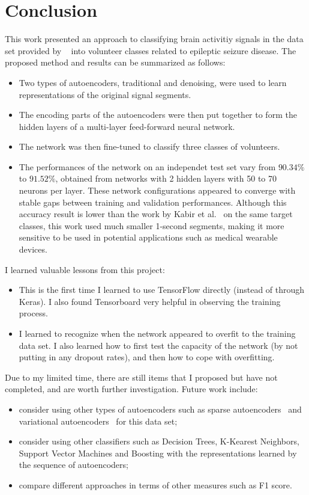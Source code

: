 \documentclass[12pt]{article}
\begin{document}
\section{Conclusion}

\noindent
This work presented an approach to classifying brain activitiy signals in the data set provided by ~\cite{andrzejak2001indications} into volunteer classes related to epileptic seizure disease. The proposed method and results can be summarized as follows:
\begin{itemize}
\item Two types of autoencoders, traditional and denoising, were used to learn representations of the original signal segments.
\item The encoding parts of the autoencoders were then put together to form the hidden layers of a multi-layer feed-forward neural network.
\item The network was then fine-tuned to classify three classes of volunteers.
\item The performances of the network on an independet test set vary from $90.34\%$ to $91.52\%$, obtained from networks with 2 hidden layers with 50 to 70 neurons per layer. These network configurations appeared to converge with stable gaps between training and validation performances. Although this accuracy result is lower than the work by Kabir et al.~\cite{kabir2016epileptic} on the same target classes, this work used much smaller 1-second segments, making it more sensitive to be used in potential applications such as medical wearable devices.
\end{itemize}

I learned valuable lessons from this project:
\begin{itemize}
\item This is the first time I learned to use TensorFlow directly (instead of through Keras). I also found Tensorboard very helpful in observing the training process.
\item I learned to recognize when the network appeared to overfit to the training data set. I also learned how to first test the capacity of the network (by not putting in any dropout rates), and then how to cope with overfitting.
\end{itemize}

Due to my limited time, there are still items that I proposed but have not completed, and are worth further investigation. Future work include: 
\begin{itemize}
\item consider using other types of autoencoders such as sparse autoencoders~\cite{boureau2008sparse} and variational autoencoders~\cite{kingma2013auto} for this data set;
\item consider using other classifiers such as Decision Trees, K-Kearest Neighbors, Support Vector Machines and Boosting with the representations learned by the sequence of autoencoders;
\item compare different approaches in terms of other measures such as F1 score.
\end{itemize}




\end{document}
